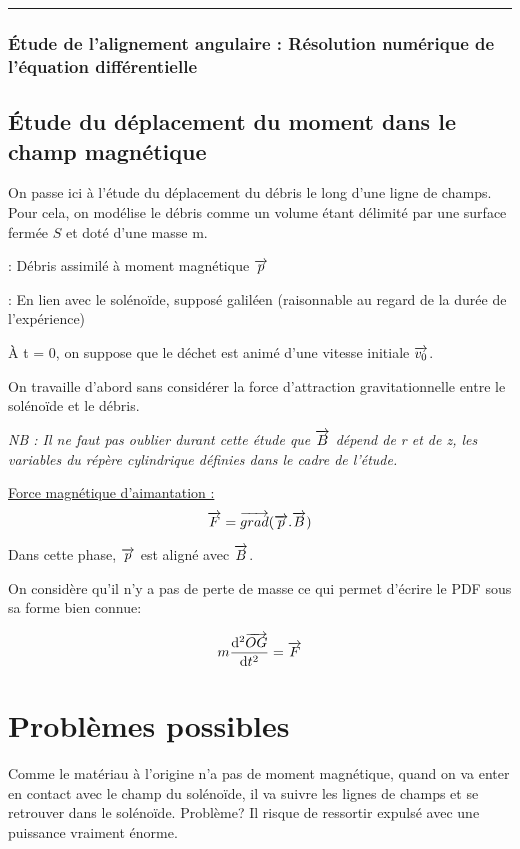 \documentclass{report}
\begin{document}
\rule{\textwidth}{0.4pt}

\subsubsection{Étude de l'alignement angulaire : Résolution numérique de l'équation différentielle}

\subsection{Étude du déplacement du moment dans le champ magnétique}

On passe ici à l'étude du déplacement du débris le long d'une ligne de champs. Pour cela, on modélise le débris comme un volume étant délimité par une surface fermée $S$ et doté d'une masse m.

: {Débris assimilé à moment magnétique $\overrightarrow{p}$}

: En lien avec le solénoïde, supposé galiléen (raisonnable au regard de la durée de l'expérience)


À t = 0, on suppose que le déchet est animé d'une vitesse initiale $\overrightarrow{v_0}$.


On travaille d'abord sans considérer la force d'attraction gravitationnelle entre le solénoïde et le débris.


\emph{NB : Il ne faut pas oublier durant cette étude que $\overrightarrow{B}$ dépend de r et de z, les variables du répère cylindrique définies dans le cadre de l'étude.}

\underline{Force magnétique d'aimantation :} 
$$\overrightarrow{F} = \overrightarrow{grad}(\overrightarrow{p}.\overrightarrow{B})$$

Dans cette phase, $\overrightarrow{p}$ est aligné avec $\overrightarrow{B}$.


On considère qu'il n'y a pas de perte de masse ce qui permet d'écrire le PDF sous sa forme bien connue:

$$m\frac{\mathrm{d^2}\overrightarrow{OG}}{\mathrm{d}t^2} = \overrightarrow{F}$$


\section{Problèmes possibles}
Comme le matériau à l'origine n'a pas de moment magnétique, quand on va enter en contact avec le champ du solénoïde, il va suivre les lignes de champs et se retrouver dans le solénoïde. Problème? Il risque de ressortir expulsé avec une puissance vraiment énorme.
\end{document}
